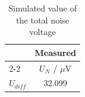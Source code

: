 \begin{table}[htbp]
  \centering
  \caption{Simulated value of the total noise voltage }
    \begin{tabular}{|l|c|}
    \hline
    \rowcolor[rgb]{ .816,  .816,  .816}  &  \textbf{Measured} \bigstrut\\
    \cline{2-2}\rowcolor[rgb]{ .816,  .816,  .816}\multirow{-2}{*}{\textbf{Total noise voltage}}&  $U_N$ / $\mu$V \bigstrut\\
    \hline
    \rowcolor[rgb]{ .816,  .816,  .816} $U_{diff}$ & \cellcolor[rgb]{ 1,  1,  1}32.099 \bigstrut\\
    \hline
    \end{tabular}%
  \label{tab:sim}%
\end{table}%